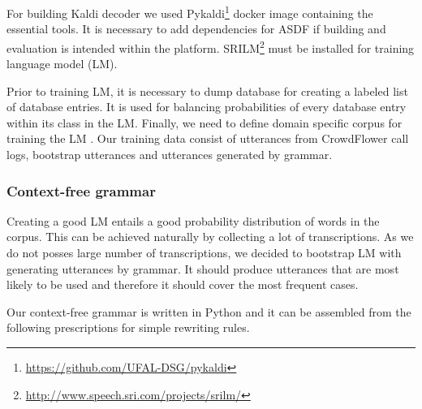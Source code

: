 For building Kaldi decoder we used Pykaldi\footnote{\url{https://github.com/UFAL-DSG/pykaldi}} docker image containing the essential tools.
It is necessary to add dependencies for ASDF if building and evaluation is intended within the platform.
SRILM\footnote{\url{http://www.speech.sri.com/projects/srilm/}} must be installed for training language model (LM).


Prior to training LM, it is necessary to dump database for creating a labeled list of database entries. %
It is used for balancing probabilities of every database entry within its class in the LM.
Finally, we need to define domain specific corpus for training the LM .
Our training data consist of utterances from CrowdFlower call logs, bootstrap utterances and utterances generated by grammar.

\subsubsection{Context-free grammar}

Creating a good LM entails a good probability distribution of words in the corpus.
This can be achieved naturally by collecting a lot of transcriptions.
As we do not posses large number of transcriptions, we decided to bootstrap LM with generating utterances by grammar.
It should produce utterances that are most likely to be used and therefore it should cover the most frequent cases. %

Our context-free grammar is written in Python and it can be assembled from the following prescriptions for simple rewriting rules.

